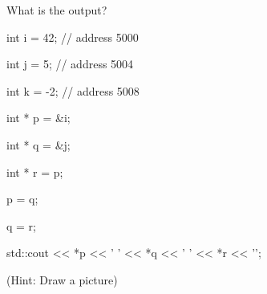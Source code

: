 What is the output?



\begin{consolethree}[escapeinside=||]

int i = 42;     // address 5000

int j = 5;      // address 5004

int k = -2;     // address 5008

int * p = &i;

int * q = &j;

int * r = p;

p = q;

q = r;

std::cout << *p << ' ' << *q << ' ' << *r << '\n'; 

\end{consolethree}

(Hint: Draw a picture)


